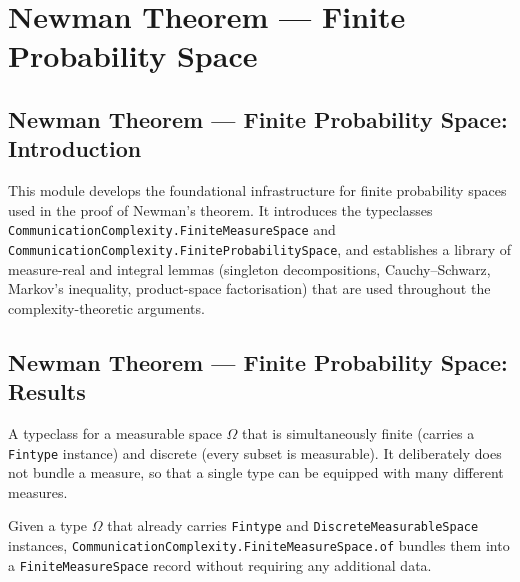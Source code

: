 \section{Newman Theorem --- Finite Probability Space}
\subsection*{Newman Theorem --- Finite Probability Space: Introduction}

This module develops the foundational infrastructure for finite probability spaces used
in the proof of Newman's theorem. It introduces the typeclasses
\texttt{CommunicationComplexity.FiniteMeasureSpace} and
\texttt{CommunicationComplexity.FiniteProbabilitySpace}, and establishes a library of
measure-real and integral lemmas (singleton decompositions, Cauchy--Schwarz, Markov's
inequality, product-space factorisation) that are used throughout the complexity-theoretic
arguments.

\subsection*{Newman Theorem --- Finite Probability Space: Results}

\begin{definition}
\label{CommunicationComplexity.FiniteMeasureSpace}
\leanok
A typeclass for a measurable space $\Omega$ that is simultaneously finite (carries a
\texttt{Fintype} instance) and discrete (every subset is measurable).  It deliberately
does not bundle a measure, so that a single type can be equipped with many different
measures.
\end{definition}

\begin{definition}
\label{CommunicationComplexity.FiniteMeasureSpace.of}
\leanok
{}
Given a type $\Omega$ that already carries \texttt{Fintype} and
\texttt{DiscreteMeasurableSpace} instances, \texttt{CommunicationComplexity.FiniteMeasureSpace.of} bundles them
into a \texttt{FiniteMeasureSpace} record without requiring any additional data.
\end{definition}

